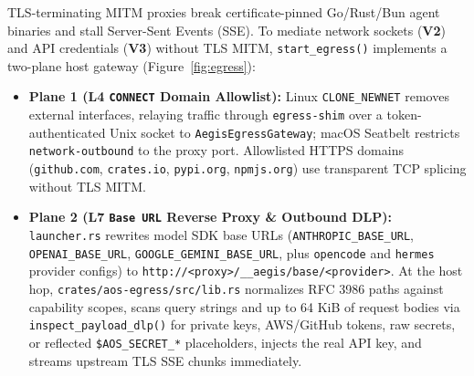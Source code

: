 \documentclass[10pt,twocolumn]{article}
\begin{document}
TLS-terminating MITM proxies break certificate-pinned Go/Rust/Bun agent binaries and stall Server-Sent Events (SSE). To mediate network sockets (\textbf{V2}) and API credentials (\textbf{V3}) without TLS MITM, \texttt{start\_egress()} implements a two-plane host gateway (Figure~\ref{fig:egress}):
\begin{itemize}
    \item \textbf{Plane 1 (L4 \texttt{CONNECT} Domain Allowlist):} Linux \texttt{CLONE\_NEWNET} removes external interfaces, relaying traffic through \texttt{egress-shim} over a token-authenticated Unix socket to \texttt{AegisEgressGateway}; macOS Seatbelt restricts \texttt{network-outbound} to the proxy port. Allowlisted HTTPS domains (\texttt{github.com}, \texttt{crates.io}, \texttt{pypi.org}, \texttt{npmjs.org}) use transparent TCP splicing without TLS MITM.
    \item \textbf{Plane 2 (L7 \texttt{Base URL} Reverse Proxy \& Outbound DLP):} \texttt{launcher.rs} rewrites model SDK base URLs (\texttt{ANTHROPIC\_BASE\_URL}, \texttt{OPENAI\_BASE\_URL}, \texttt{GOOGLE\_GEMINI\_BASE\_URL}, plus \texttt{opencode} and \texttt{hermes} provider configs) to \texttt{http://<proxy>/\_\_aegis/base/<provider>}. At the host hop, \texttt{crates/aos-egress/src/lib.rs} normalizes RFC 3986 paths against capability scopes, scans query strings and up to 64 KiB of request bodies via \texttt{inspect\_payload\_dlp()} for private keys, AWS/GitHub tokens, raw secrets, or reflected \texttt{\$AOS\_SECRET\_*} placeholders, injects the real API key, and streams upstream TLS SSE chunks immediately.
\end{itemize}
\end{document}

